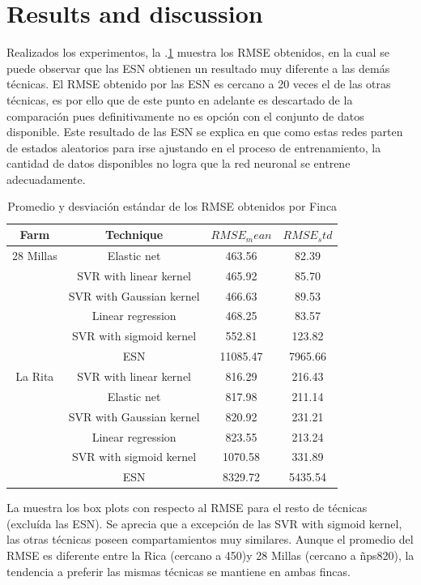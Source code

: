 \section{Results and discussion}
\label{sec:results}

Realizados los experimentos, la \tablename $.$\ref{tabla2} muestra los RMSE obtenidos, en la cual se puede observar que las ESN obtienen un resultado muy diferente a las demás técnicas. El RMSE obtenido por las ESN es cercano a 20 veces el de las otras técnicas, es por ello que de este punto en adelante es descartado de la comparación pues definitivamente no es opción con el conjunto de datos disponible. Este resultado de las ESN se explica en que como estas redes parten de estados aleatorios para irse ajustando en el proceso de entrenamiento, la cantidad de datos disponibles no logra que la red neuronal se entrene adecuadamente.
%
\begin{table}[h] 
\caption{Promedio y desviación estándar de los RMSE obtenidos por Finca} 
\label{tabla2} 
\centering
\begin{tabular}{c|c|c|c} 
\hline
\bfseries Farm & \bfseries Technique & \bfseries $RMSE_mean$ & \bfseries $RMSE_std$\\ 
\hline\hline 
28 Millas  	& Elastic net  & 463.56	& 	82.39  \\
			& SVR with linear kernel  & 465.92  & 85.70  \\
			& SVR with Gaussian kernel  & 466.63 & 89.53  \\						
			& Linear regression  & 468.25 & 83.57  \\									
			& SVR with sigmoid kernel & 552.81 & 123.82  \\									
			& ESN  & 11085.47 &  7965.66 \\												
\hline 
La Rita  	& SVR with linear kernel  & 816.29	& 	216.43  \\
			& Elastic net   &  817.98 &  211.14 \\
			& SVR with Gaussian kernel  & 820.92 & 231.21  \\						
			& Linear regression  & 823.55 &  213.24 \\									
			& SVR with sigmoid kernel & 1070.58 &  331.89 \\									
			& ESN  & 8329.72 & 5435.54  \\												
\hline    
\end{tabular} 
\end{table}
%
La  muestra los box plots con respecto al RMSE para el resto de técnicas (excluída las ESN). Se aprecia que a excepción de las SVR with sigmoid kernel, las otras técnicas poseen compartamientos muy similares. Aunque el promedio del RMSE es diferente entre la Rica (cercano a 450)y 28 Millas (cercano a ñps820), la tendencia a preferir las mismas técnicas se mantiene en ambas fincas.

